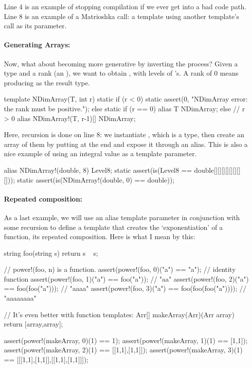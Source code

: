 Line 4 is an example of  stopping compilation if we ever get into a bad code path. Line 8 is an example of a Matrioshka call: a template using another template's call as its parameter.

\paragraph{Generating Arrays:}

Now, what about becoming more generative by inverting the process? Given a type  and a rank  (an ), we want to obtain , with  levels of \DD{[]}'s. A rank of 0 means producing  as the result type.

\begin{ndcode}
template NDimArray(T, int r)
{
    static if (r < 0)
        static assert(0, "NDimArray error: the rank must be positive.");
    else static if (r == 0)
        alias T NDimArray;
    else // r > 0
        alias NDimArray!(T, r-1)[] NDimArray;
}
\end{ndcode}

Here, recursion is done on line 8: we instantiate , which is a type, then create an array of them by putting \DD{[]} at the end and expose it through an alias. This is also a nice example of using an integral value as a template parameter.

\begin{dcode}
alias NDimArray!(double, 8) Level8;
static assert(is(Level8 == double[][][][][][][][]));
static assert(is(NDimArray!(double, 0) == double));
\end{dcode}

\paragraph{Repeated composition:} 

As a last example, we will use an alias template parameter in conjunction with some  recursion to define a template that creates the `exponentiation' of a function, its repeated composition. Here is what I mean by this:

\begin{dcode}
string foo(string s) { return s ~ s;}

// power!(foo, n) is a function.
assert(power!(foo, 0)("a") == "a");                // identity function
assert(power!(foo, 1)("a") == foo("a"));           // "aa"
assert(power!(foo, 2)("a") == foo(foo("a")));      // "aaaa"
assert(power!(foo, 3)("a") == foo(foo(foo("a")))); // "aaaaaaaa"

// It's even better with function templates:
Arr[] makeArray(Arr)(Arr array) { return [array,array];}

assert(power!(makeArray, 0)(1) == 1);
assert(power!(makeArray, 1)(1) == [1,1]);
assert(power!(makeArray, 2)(1) == [[1,1],[1,1]]);
assert(power!(makeArray, 3)(1) == [[[1,1],[1,1]],[[1,1],[1,1]]]);
\end{dcode}

